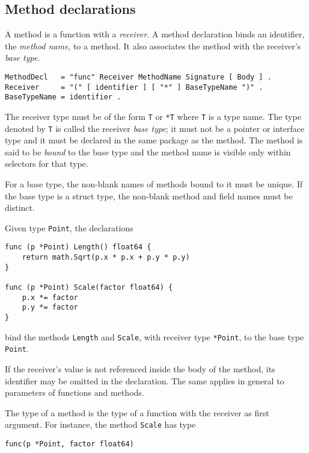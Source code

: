 \subsection*{Method declarations}

A method is a function with a \emph{receiver}. A method declaration
binds an identifier, the \emph{method name}, to a method. It also
associates the method with the receiver's \emph{base type}.

\begin{Verbatim}[frame=single]
MethodDecl   = "func" Receiver MethodName Signature [ Body ] .
Receiver     = "(" [ identifier ] [ "*" ] BaseTypeName ")" .
BaseTypeName = identifier .
\end{Verbatim}

The receiver type must be of the form \texttt{T} or \texttt{*T} where
\texttt{T} is a type name. The type denoted by \texttt{T} is called the
receiver \emph{base type}; it must not be a pointer or interface type
and it must be declared in the same package as the method. The method is
said to be \emph{bound} to the base type and the method name is visible
only within selectors for that type.

For a base type, the non-blank names of
methods bound to it must be
unique. If the base type is a
struct type, the non-blank method and field
names must be distinct.

Given type \texttt{Point}, the declarations

\begin{Verbatim}[frame=single]
func (p *Point) Length() float64 {
    return math.Sqrt(p.x * p.x + p.y * p.y)
}

func (p *Point) Scale(factor float64) {
    p.x *= factor
    p.y *= factor
}
\end{Verbatim}

bind the methods \texttt{Length} and \texttt{Scale}, with receiver type
\texttt{*Point}, to the base type \texttt{Point}.

If the receiver's value is not referenced inside the body of the method,
its identifier may be omitted in the declaration. The same applies in
general to parameters of functions and methods.

The type of a method is the type of a function with the receiver as
first argument. For instance, the method \texttt{Scale} has type

\begin{Verbatim}[frame=single]
func(p *Point, factor float64)
\end{Verbatim}

